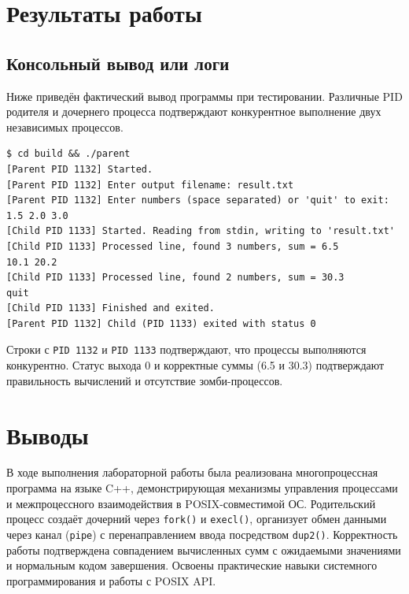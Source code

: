 \documentclass[11pt, a4paper]{article}
\begin{document}
\section{Результаты работы}

\subsection{Консольный вывод или логи}
Ниже приведён фактический вывод программы при тестировании. Различные PID родителя и дочернего процесса подтверждают конкурентное выполнение двух независимых процессов.

\begin{verbatim}
$ cd build && ./parent
[Parent PID 1132] Started.
[Parent PID 1132] Enter output filename: result.txt
[Parent PID 1132] Enter numbers (space separated) or 'quit' to exit:
1.5 2.0 3.0
[Child PID 1133] Started. Reading from stdin, writing to 'result.txt'
[Child PID 1133] Processed line, found 3 numbers, sum = 6.5
10.1 20.2
[Child PID 1133] Processed line, found 2 numbers, sum = 30.3
quit
[Child PID 1133] Finished and exited.
[Parent PID 1132] Child (PID 1133) exited with status 0
\end{verbatim}

Строки с \texttt{PID 1132} и \texttt{PID 1133} подтверждают, что процессы выполняются конкурентно. Статус выхода 0 и корректные суммы (6.5 и 30.3) подтверждают правильность вычислений и отсутствие зомби-процессов.

\section{Выводы}
В ходе выполнения лабораторной работы была реализована многопроцессная программа на языке C++, демонстрирующая механизмы управления процессами и межпроцессного взаимодействия в POSIX-совместимой ОС. Родительский процесс создаёт дочерний через \texttt{fork()} и \texttt{execl()}, организует обмен данными через канал (\texttt{pipe}) с перенаправлением ввода посредством \texttt{dup2()}. Корректность работы подтверждена совпадением вычисленных сумм с ожидаемыми значениями и нормальным кодом завершения. Освоены практические навыки системного программирования и работы с POSIX API.
\end{document}
